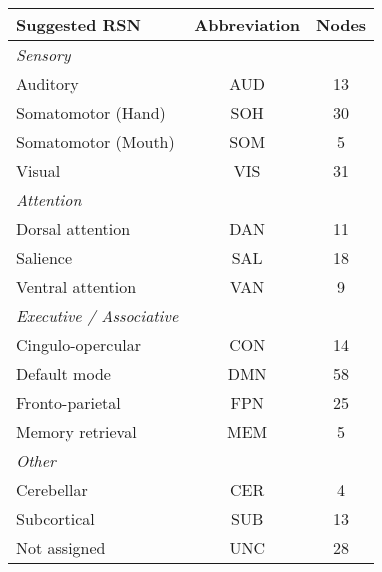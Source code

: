 \begin{tabular}{lcc}
\toprule 
Suggested RSN & Abbreviation & Nodes \\ 
\midrule 
\textit{Sensory} & & \\
	\hspace{3pt}Auditory  			&  AUD & 13 \\ 
	\hspace{3pt}Somatomotor (Hand)	&  SOH & 30 \\
	\hspace{3pt}Somatomotor (Mouth)	&  SOM & 5 \\
	\hspace{3pt}Visual	 			&  VIS & 31 \\ 
\textit{Attention} & & \\
	\hspace{3pt}Dorsal attention  	&  DAN & 11	\\ 
	\hspace{3pt}Salience		  	&  SAL & 18 \\ 
	\hspace{3pt}Ventral attention  	&  VAN & 9 \\ 
\textit{Executive / Associative} & & \\
	\hspace{3pt}Cingulo-opercular 	& CON & 14 \\ 
	\hspace{3pt}Default mode		& DMN & 58 \\
	\hspace{3pt}Fronto-parietal  	& FPN & 25 \\ 
	\hspace{3pt}Memory retrieval	& MEM & 5 \\
\textit{Other} & & \\
	\hspace{3pt}Cerebellar			& CER & 4  \\
	\hspace{3pt}Subcortical			& SUB & 13 \\
	\hspace{3pt}Not assigned 		& UNC & 28 \\ 
\bottomrule 
\end{tabular}